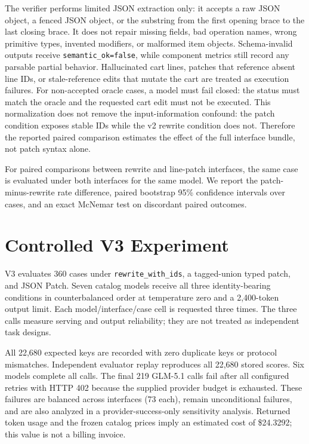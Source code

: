\documentclass[11pt]{article}
\begin{document}
The verifier performs limited JSON extraction only: it accepts a raw JSON
object, a fenced JSON object, or the substring from the first opening brace to
the last closing brace. It does not repair missing fields, bad operation names,
wrong primitive types, invented modifiers, or malformed item objects.
Schema-invalid outputs receive \texttt{semantic\_ok=false}, while component
metrics still record any parsable partial behavior. Hallucinated cart lines,
patches that reference absent line IDs, or stale-reference edits that mutate
the cart are treated as execution failures. For non-accepted oracle cases, a
model must fail closed: the status must match the oracle and the requested cart
edit must not be executed. This normalization does not remove the
input-information confound: the patch condition exposes stable IDs while the
v2 rewrite condition does not. Therefore the reported paired comparison
estimates the effect of the full interface bundle, not patch syntax alone.

For paired comparisons between rewrite and line-patch interfaces, the same
case is evaluated under both interfaces for the same model. We report the
patch-minus-rewrite rate difference, paired bootstrap 95\% confidence intervals
over cases, and an exact McNemar test on discordant paired outcomes.

\section{Controlled V3 Experiment}
V3 evaluates 360 cases under \texttt{rewrite\_with\_ids}, a tagged-union typed
patch, and JSON Patch. Seven catalog models receive all three identity-bearing
conditions in counterbalanced order at temperature zero and a 2,400-token
output limit. Each model/interface/case cell is requested three times. The
three calls measure serving and output reliability; they are not treated as
independent task designs.

All 22,680 expected keys are recorded with zero duplicate keys or protocol
mismatches. Independent evaluator replay reproduces all 22,680 stored scores.
Six models complete all calls. The final 219 GLM-5.1 calls fail after all
configured retries with HTTP 402 because the supplied provider budget is
exhausted. These failures are balanced across interfaces (73 each), remain
unconditional failures, and are also analyzed in a provider-success-only
sensitivity analysis. Returned token usage and the frozen catalog prices imply
an estimated cost of \$24.3292; this value is not a billing invoice.
\end{document}
